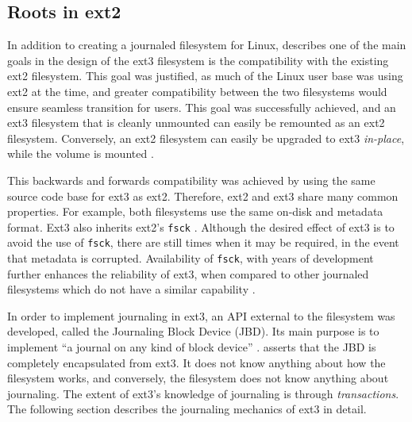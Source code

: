 \subsection{Roots in ext2}

In addition to creating a journaled filesystem for Linux, \citet{Tweedie2000} describes one of the main goals in the design of the ext3 filesystem is the compatibility with the existing ext2 filesystem. This goal was justified, as much of the Linux user base was using ext2 at the time, and greater compatibility between the two filesystems would ensure seamless transition for users. This goal was successfully achieved, and an ext3 filesystem that is cleanly unmounted can easily be remounted as an ext2 filesystem. Conversely, an ext2 filesystem can easily be upgraded to ext3 \emph{in-place}, while the volume is mounted \citep{Tweedie2000, Robbins2001, Bovet2006}.

This backwards and forwards compatibility was achieved by using the same source code base for ext3 as ext2. Therefore, ext2 and ext3 share many common properties. For example, both filesystems use the same on-disk and metadata format. Ext3 also inherits ext2's \texttt{fsck} \citep{Robbins2001, Tweedie2000}. Although the desired effect of ext3 is to avoid the use of \texttt{fsck}, there are still times when it may be required, in the event that metadata is corrupted. Availability of \texttt{fsck}, with years of development further enhances the reliability of ext3, when compared to other journaled filesystems which do not have a similar capability \citep{Robbins2001}.

In order to implement journaling in ext3, an API external to the filesystem was developed, called the Journaling Block Device (JBD). Its main purpose is to implement ``a journal on any kind of block device'' \citep[p. 8]{Robbins2001}. \citet{Tweedie2000} asserts that the JBD is completely encapsulated from ext3. It does not know anything about how the filesystem works, and conversely, the filesystem does not know anything about journaling. The extent of ext3's knowledge of journaling is through \emph{transactions}. The following section describes the journaling mechanics of ext3 in detail.